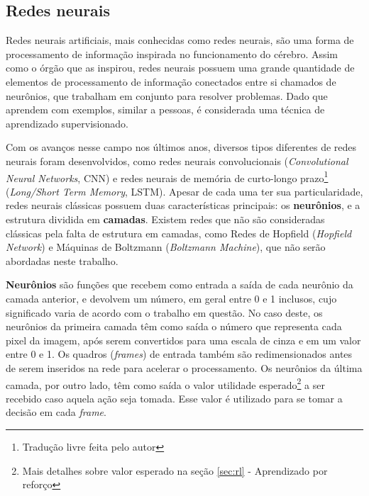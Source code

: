 \subsection{Redes neurais}
\label{sec:nn}

Redes neurais artificiais, mais conhecidas como redes neurais, são uma forma de processamento de informação inspirada no funcionamento do cérebro. Assim como o órgão que as inspirou, redes neurais possuem uma grande quantidade de elementos de processamento de informação conectados entre si chamados de neurônios, que trabalham em conjunto para resolver problemas. Dado que aprendem com exemplos, similar a pessoas, é considerada uma técnica de aprendizado supervisionado.

Com os avanços nesse campo nos últimos anos, diversos tipos diferentes de redes neurais foram desenvolvidos, como redes neurais convolucionais (\textit{Convolutional Neural Networks}, CNN) e redes neurais de memória de curto-longo prazo\footnote{Tradução livre feita pelo autor} (\textit{Long/Short Term Memory}, LSTM). Apesar de cada uma ter sua particularidade, redes neurais clássicas possuem duas características principais: os \textbf{neurônios}, e a estrutura dividida em \textbf{camadas}. Existem redes que não são consideradas clássicas pela falta de estrutura em camadas, como Redes de Hopfield (\textit{Hopfield Network}) e Máquinas de Boltzmann (\textit{Boltzmann Machine}), que não serão abordadas neste trabalho.

\textbf{Neurônios} são funções que recebem como entrada a saída de cada neurônio da camada anterior, e devolvem um número, em geral entre 0 e 1 inclusos, cujo significado varia de acordo com o trabalho em questão.
No caso deste, os neurônios da primeira camada têm como saída o número que representa cada pixel da imagem, após serem convertidos para uma escala de cinza e em um valor entre 0 e 1. Os quadros (\textit{frames}) de entrada também são redimensionados antes de serem inseridos na rede para acelerar o processamento.
Os neurônios da última camada, por outro lado, têm como saída o valor utilidade esperado\footnote{Mais detalhes sobre valor esperado na seção \ref{sec:rl} - Aprendizado por reforço} a ser recebido caso aquela ação seja tomada. Esse valor é utilizado para se tomar a decisão em cada \textit{frame}. 

